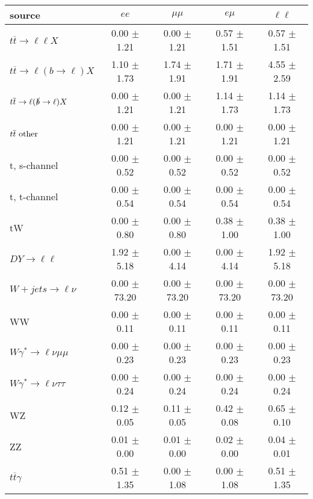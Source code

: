 \begin{tabular}{l|cccc} \hline\hline
source & $ee$ & $\mu\mu$ & $e\mu$ & $\ell\ell $ \\
\hline
$t\overline{t} \rightarrow \ell \ell X$ &  0.00 $\pm$  1.21 &  0.00 $\pm$  1.21 &  0.57 $\pm$  1.51 &  0.57 $\pm$  1.51 \\
$t\overline{t} \rightarrow \ell (b \rightarrow \ell) X$ &  1.10 $\pm$  1.73 &  1.74 $\pm$  1.91 &  1.71 $\pm$  1.91 &  4.55 $\pm$  2.59 \\
$t\overline{t} \rightarrow \ell (\slashed b \rightarrow \ell) X$ &  0.00 $\pm$  1.21 &  0.00 $\pm$  1.21 &  1.14 $\pm$  1.73 &  1.14 $\pm$  1.73 \\
        $t\overline{t}\ \rm{other}$ &  0.00 $\pm$  1.21 &  0.00 $\pm$  1.21 &  0.00 $\pm$  1.21 &  0.00 $\pm$  1.21 \\
\hline
                       t, s-channel &  0.00 $\pm$  0.52 &  0.00 $\pm$  0.52 &  0.00 $\pm$  0.52 &  0.00 $\pm$  0.52 \\
                       t, t-channel &  0.00 $\pm$  0.54 &  0.00 $\pm$  0.54 &  0.00 $\pm$  0.54 &  0.00 $\pm$  0.54 \\
                                 tW &  0.00 $\pm$  0.80 &  0.00 $\pm$  0.80 &  0.38 $\pm$  1.00 &  0.38 $\pm$  1.00 \\
\hline
         $DY \rightarrow \ell \ell$ &  1.92 $\pm$  5.18 &  0.00 $\pm$  4.14 &  0.00 $\pm$  4.14 &  1.92 $\pm$  5.18 \\
      $W+jets \rightarrow \ell \nu$ &  0.00 $\pm$ 73.20 &  0.00 $\pm$ 73.20 &  0.00 $\pm$ 73.20 &  0.00 $\pm$ 73.20 \\
                                 WW &  0.00 $\pm$  0.11 &  0.00 $\pm$  0.11 &  0.00 $\pm$  0.11 &  0.00 $\pm$  0.11 \\
\hline
$W\gamma^{*} \rightarrow \ell \nu \mu\mu$ &  0.00 $\pm$  0.23 &  0.00 $\pm$  0.23 &  0.00 $\pm$  0.23 &  0.00 $\pm$  0.23 \\
$W\gamma^{*} \rightarrow \ell \nu \tau\tau$ &  0.00 $\pm$  0.24 &  0.00 $\pm$  0.24 &  0.00 $\pm$  0.24 &  0.00 $\pm$  0.24 \\
                                 WZ &  0.12 $\pm$  0.05 &  0.11 $\pm$  0.05 &  0.42 $\pm$  0.08 &  0.65 $\pm$  0.10 \\
                                 ZZ &  0.01 $\pm$  0.00 &  0.01 $\pm$  0.00 &  0.02 $\pm$  0.00 &  0.04 $\pm$  0.01 \\
\hline
              $t\overline{t}\gamma$ &  0.51 $\pm$  1.35 &  0.00 $\pm$  1.08 &  0.00 $\pm$  1.08 &  0.51 $\pm$  1.35 \\

\end{tabular}
